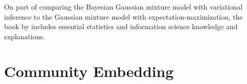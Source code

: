 \documentclass[conference]{IEEEtran}
\begin{document}
On part of comparing the Bayesian Gaussian mixture model with variational inference to the Gaussian mixture model with expectation-maximization, the \citeyear{Bishop06} book  by \citeauthor{Bishop06} includes essential statistics and information science knowledge and explanations.\cite{Bishop06}

\section{Community Embedding}






\end{document}
